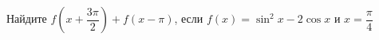 \begin{ex}
	\begin{condition}
		Найдите \( f\left( x+\dfrac{3\pi}{2} \right)+f\left( x-\pi \right) \), если \( f(x)=\sin^2 x -2\cos x \) и \( x=\dfrac{\pi}{4} \)
	\end{condition}
\end{ex}